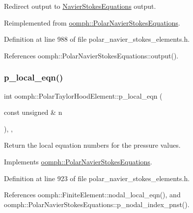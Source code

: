 Redirect output to \hyperlink{classoomph_1_1NavierStokesEquations}{Navier\+Stokes\+Equations} output. 



Reimplemented from \hyperlink{classoomph_1_1PolarNavierStokesEquations_a1dd19ac88c126db21ad12bdb06a512f9}{oomph\+::\+Polar\+Navier\+Stokes\+Equations}.



Definition at line 988 of file polar\+\_\+navier\+\_\+stokes\+\_\+elements.\+h.



References oomph\+::\+Polar\+Navier\+Stokes\+Equations\+::output().

\mbox{\label{classoomph_1_1PolarTaylorHoodElement_ab50b43e4dadba14413f8b84b35eea9aa}} 
\subsubsection{\texorpdfstring{p\+\_\+local\+\_\+eqn()}{p\_local\_eqn()}}
{\footnotesize\ttfamily int oomph\+::\+Polar\+Taylor\+Hood\+Element\+::p\+\_\+local\+\_\+eqn (\begin{DoxyParamCaption}\item[{const unsigned \&}]{n }\end{DoxyParamCaption})\hspace{0.3cm}{\ttfamily [inline]}, {\ttfamily [protected]}, {\ttfamily [virtual]}}



Return the local equation numbers for the pressure values. 



Implements \hyperlink{classoomph_1_1PolarNavierStokesEquations_a4738c2cb0df9ba80c581442ceade039e}{oomph\+::\+Polar\+Navier\+Stokes\+Equations}.



Definition at line 923 of file polar\+\_\+navier\+\_\+stokes\+\_\+elements.\+h.



References oomph\+::\+Finite\+Element\+::nodal\+\_\+local\+\_\+eqn(), and oomph\+::\+Polar\+Navier\+Stokes\+Equations\+::p\+\_\+nodal\+\_\+index\+\_\+pnst().

